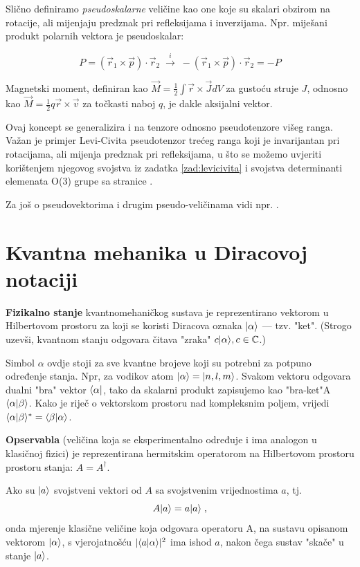 Slično definiramo \emph{pseudoskalarne} veličine kao one koje su skalari
obzirom na rotacije, ali mijenjaju predznak pri refleksijama i inverzijama.
Npr. miješani produkt polarnih vektora je pseudoskalar:

\[
P = (\vec{r}_1 \times \vec{p}) \cdot \vec{r}_2  \; \stackrel{i}{\longrightarrow} \;
  - (\vec{r}_1 \times \vec{p}) \cdot \vec{r}_2 = - P
\]

Magnetski moment, definiran kao $\vec{M} = \frac{1}{2} \int \vec{r}
\times \vec{J} dV$ za gustoću struje $J$, odnosno kao
$\vec{M} = \frac{1}{2} q \vec{r} \times \vec{v}$ za točkasti
naboj $q$, je dakle aksijalni vektor.

Ovaj koncept se generalizira i na tenzore odnosno pseudotenzore višeg ranga.
Važan je primjer Levi-Civita pseudotenzor trećeg ranga koji je invarijantan
pri rotacijama, ali mijenja predznak pri refleksijama, u što se možemo uvjeriti
korištenjem njegovog svojstva iz zadatka \ref{zad:levicivita} i svojstva
determinanti elemenata O(3) grupe sa stranice \pageref{pag:detO3}.

Za još o pseudovektorima i drugim pseudo-veličinama vidi
npr. \cite{Arfken:1995}.


\chapter{Kvantna mehanika u Diracovoj notaciji}
\label{sec:qm}

\textbf{Fizikalno stanje} kvantnomehaničkog sustava
je reprezentirano vektorom u Hilbertovom prostoru za
koji se koristi Diracova oznaka
 $| \alpha \rangle$ --- tzv. "ket". 
(Strogo uzevši, kvantnom stanju odgovara
čitava "zraka" $c| \alpha \rangle, c\in\mathbb{C}$.)

Simbol $\alpha$ ovdje stoji za sve kvantne brojeve koji su potrebni za potpuno
određenje stanja. Npr, za vodikov atom $| \alpha \rangle=| n,l,m \rangle$.
Svakom vektoru odgovara dualni "bra" vektor $\langle \alpha |$, tako
da skalarni produkt zapisujemo kao "bra-ket"A
$\langle \alpha |\beta \rangle$. Kako je riječ o vektorskom prostoru
nad kompleksnim poljem, vrijedi
$\langle \alpha |\beta \rangle^{*} = \langle \beta |\alpha \rangle$.

\textbf{Opservabla} (veličina koja se eksperimentalno određuje i ima
 analogon u klasičnoj fizici) je reprezentirana hermitskim operatorom na
 Hilbertovom prostoru prostoru stanja: $A=A^{\dagger}$.

Ako su $| a \rangle$ svojstveni vektori od $A$ sa svojstvenim vrijednostima
$a$, tj.
\begin{displaymath}
                A| a \rangle=a| a \rangle \;,
\end{displaymath}
onda mjerenje klasične veličine koja odgovara operatoru A, na sustavu
opisanom vektorom $| \alpha \rangle$, s vjerojatnošću $|\langle a |\alpha\rangle|^2$
ima ishod $a$, nakon čega sustav "skače" u stanje $| a \rangle$.


